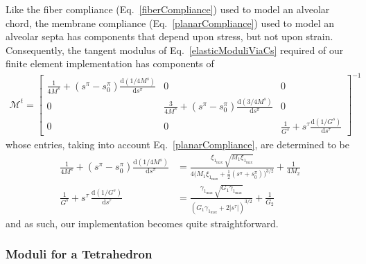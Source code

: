 Like the fiber compliance (Eq.~\ref{fiberCompliance}) used to model an alveolar chord, the membrane compliance (Eq.~\ref{planarCompliance}) used to model an alveolar septa has components that depend upon stress, but not upon strain.  Consequently, the tangent modulus of Eq.~\ref{elasticModuliViaCs} required of our finite element implementation has components of
\small
\begin{multline}
    \boldsymbol{\mathcal{M}}^t =  \begin{bmatrix}
    \frac{1}{4M^s} + ( s^{\pi} - s^{\pi}_0 ) \frac{\mathrm{d} (1 / 4M^s)}
    {\mathrm{d} s^{\pi}}
    & 0 & 0 \\
    0 & \frac{3}{4M^s} + ( s^{\pi} - s^{\pi}_0 ) \frac{\mathrm{d} (3 / 4M^s)}
    {\mathrm{d} s^{\pi}} & 0 \\
    0 & 0 & \frac{1}{G^s} + s^{\tau} \frac{\mathrm{d} (1/G^s)}{\mathrm{d} s^{\tau}} 
    \end{bmatrix}^{-1}
    \label{pentagonTangentModulus}
\end{multline}
\normalsize
whose entries, taking into account Eq.~\ref{planarCompliance}, are determined to be
\begin{subequations}
    \begin{align}
    \frac{1}{4M^s} + ( s^{\pi} - s^{\pi}_0 ) \frac{\mathrm{d}(1/4M^s)}{\mathrm{d} s^{\pi}} & = \frac{\xi_{1_{\max}} \, \sqrt{M_1 \xi_{1_{\max}}}}
    {4 \bigl( M_1 \xi_{1_{\max}} + \frac{1}{2} ( s^{\pi} + s^{\pi}_0 ) \bigr)^{3/2}}
    + \frac{1}{4M_2} \\
    \frac{1}{G^s} + s^{\tau} \, \frac{\mathrm{d}(1/G^s)}{\mathrm{d} s^{\tau}} & = 
    \frac{\gamma_{1_{\max}} \, \sqrt{G_1 \gamma_{1_{\max}}}}
    {( G_1 \gamma_{1_{\max}} + 2 | s^{\tau} | )^{3/2}} + \frac{1}{G_2}
    \end{align}
\end{subequations}
and as such, our implementation becomes quite straightforward.

\subsubsection{Moduli for a Tetrahedron}

